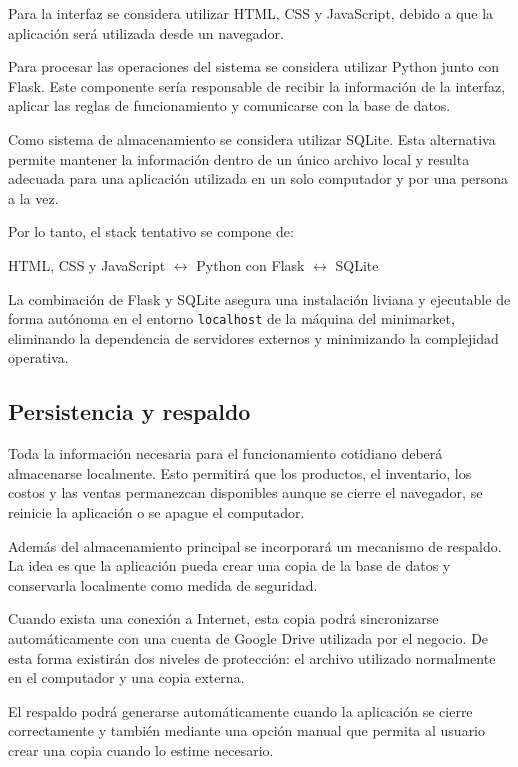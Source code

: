 \documentclass[10pt,a4paper]{article}
\begin{document}
Para la interfaz se considera utilizar HTML, CSS y JavaScript, debido a que la aplicación será utilizada desde un navegador.

Para procesar las operaciones del sistema se considera utilizar Python junto con Flask. Este componente sería responsable de recibir la información de la interfaz, aplicar las reglas de funcionamiento y comunicarse con la base de datos.

Como sistema de almacenamiento se considera utilizar SQLite. Esta alternativa permite mantener la información dentro de un único archivo local y resulta adecuada para una aplicación utilizada en un solo computador y por una persona a la vez.

Por lo tanto, el stack tentativo se compone de:

\begin{center}
HTML, CSS y JavaScript
$\longleftrightarrow$
Python con Flask
$\longleftrightarrow$
SQLite
\end{center}

La combinación de Flask y SQLite asegura una instalación liviana y ejecutable de forma autónoma en el entorno \texttt{localhost} de la máquina del minimarket, eliminando la dependencia de servidores externos y minimizando la complejidad operativa.


\subsection{Persistencia y respaldo}

Toda la información necesaria para el funcionamiento cotidiano deberá almacenarse localmente. Esto permitirá que los productos, el inventario, los costos y las ventas permanezcan disponibles aunque se cierre el navegador, se reinicie la aplicación o se apague el computador.

Además del almacenamiento principal se incorporará un mecanismo de respaldo. La idea es que la aplicación pueda crear una copia de la base de datos y conservarla localmente como medida de seguridad.

Cuando exista una conexión a Internet, esta copia podrá sincronizarse automáticamente con una cuenta de Google Drive utilizada por el negocio. De esta forma existirán dos niveles de protección: el archivo utilizado normalmente en el computador y una copia externa.

El respaldo podrá generarse automáticamente cuando la aplicación se cierre correctamente y también mediante una opción manual que permita al usuario crear una copia cuando lo estime necesario.
\end{document}
